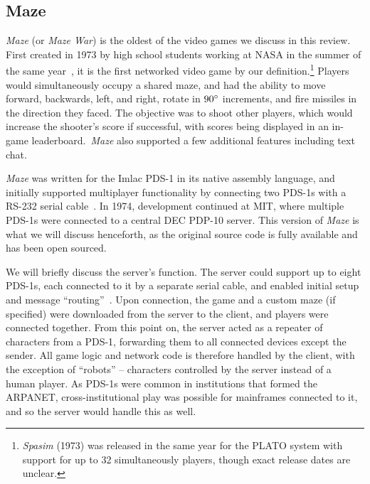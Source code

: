 \subsection{Maze}\label{subsec:maze}

\textit{Maze} (or \textit{Maze War}) is the oldest of the video games we discuss in this review. First created in 1973 by high school students working at NASA in the summer of the same year~\cite{thompson}, it is the first networked video game by our definition.\footnote{\textit{Spasim} (1973) was released in the same year for the PLATO system with support for up to 32 simultaneously players, though exact release dates are unclear.}
Players would simultaneously occupy a shared maze, and had the ability to move forward, backwards, left, and right, rotate in $90\degree$ increments, and fire missiles in the direction they faced. The objective was to shoot other players, which would increase the shooter's score if successful, with scores being displayed in an in-game leaderboard.\ \textit{Maze} also supported a few additional features including text chat.

\textit{Maze} was written for the Imlac PDS-1 in its native assembly language, and initially supported multiplayer functionality by connecting two PDS-1s with a RS-232 serial cable~\cite{thompson}. In 1974, development continued at MIT, where multiple PDS-1s were connected to a central DEC PDP-10 server. This version of \textit{Maze} is what we will discuss henceforth, as the original source code is fully available and has been open sourced.

%

We will briefly discuss the server's function. The server could support up to eight PDS-1s, each connected to it by a separate serial cable, and enabled initial setup and message ``routing''~\cite{thompson}. Upon connection, the game and a custom maze (if specified) were downloaded from the server to the client, and players were connected together. From this point on, the server acted as a repeater of characters from a PDS-1, forwarding them to all connected devices except the sender. All game logic and network code is therefore handled by the client, with the exception of ``robots'' -- characters controlled by the server instead of a human player.
As PDS-1s were common in institutions that formed the ARPANET, cross-institutional play was possible for mainframes connected to it, and so the server would handle this as well.

%

